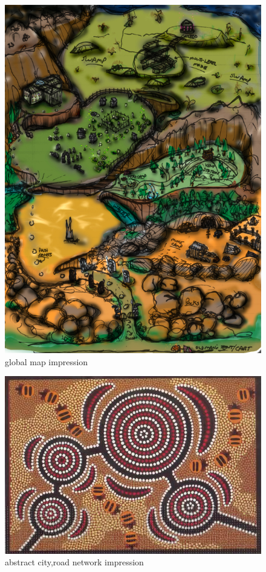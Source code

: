 \documentclass{article}
\begin{document}
\begin{figure}
  \begin{center}
	\includegraphics{images/map_design.jpg}
\end{center}
	\caption{global map impression}\label{fig:global_map}
\end{figure}

\begin{figure}
  \begin{center}
	\includegraphics{images/aboriginal_art.jpg}
\end{center}
	\caption{abstract city,road network impression}\label{fig:aboriginal}
\end{figure}
\end{document}
